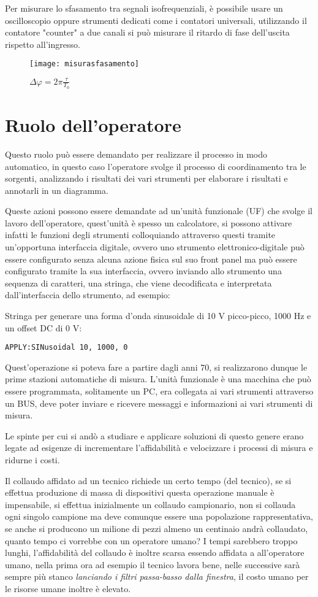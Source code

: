 Per misurare lo sfasamento tra segnali isofrequenziali, è possibile usare
un oscilloscopio
oppure strumenti dedicati come i contatori universali, utilizzando il contatore
"counter" a due
canali si può misurare il ritardo di fase dell'uscita rispetto all'ingresso.
\begin{figure}[h]
\centering\texttt{[image: misurasfasamento]}
\caption{$\Delta\varphi = 2\pi \frac{\tau}{T_0}$}
\end{figure}


\section{Ruolo dell'operatore}
Questo ruolo può essere demandato per realizzare il processo in modo automatico,
in questo caso l'operatore
svolge il processo di coordinamento tra le sorgenti, analizzando i risultati dei
vari strumenti per
elaborare i risultati e annotarli in un diagramma.

Queste azioni possono essere demandate ad un'unità funzionale (UF) che svolge il
lavoro
dell'operatore, quest'unità è spesso un calcolatore, si possono attivare infatti
le funzioni degli
strumenti colloquiando attraverso questi tramite un'opportuna interfaccia
digitale, ovvero uno
strumento elettronico-digitale può essere configurato senza alcuna azione fisica
sul suo front
panel ma può essere configurato tramite la sua interfaccia, ovvero inviando allo
strumento una
sequenza di caratteri, una stringa, che viene decodificata e interpretata
dall'interfaccia dello
strumento, ad esempio:

Stringa per generare una forma d'onda sinusoidale di 10 V picco-picco, 1000 Hz
e un offset DC di 0 V:

\noindent
\verb|APPLY:SINusoidal 10, 1000, 0|

Quest'operazione si poteva fare a partire dagli anni 70, si realizzarono dunque
le prime stazioni
automatiche di misura.
L'unità funzionale è una macchina che può essere programmata, solitamente un PC,
era collegata ai
vari strumenti attraverso un BUS, deve poter inviare e ricevere messaggi e
informazioni ai vari
strumenti di misura.

Le spinte per cui si andò a studiare e applicare soluzioni di questo genere
erano legate ad
esigenze di incrementare l'affidabilità e velocizzare i processi di misura e
ridurne i costi.

Il collaudo affidato ad un tecnico richiede un certo tempo (del tecnico), se si
effettua produzione
di massa di dispositivi questa operazione manuale è impensabile, si effettua
inizialmente un
collaudo campionario, non si collauda ogni singolo campione ma deve comunque
essere una popolazione
rappresentativa, se anche si producono un milione di pezzi almeno un centinaio
andrà
collaudato, quanto tempo ci vorrebbe con un operatore umano? I tempi sarebbero
troppo lunghi,
l'affidabilità del collaudo è inoltre scarsa essendo affidata a all'operatore
umano, nella prima
ora ad esempio il tecnico lavora bene, nelle successive sarà sempre più stanco
\textit{lanciando i filtri
passa-basso dalla finestra}, il costo umano per le risorse umane inoltre è
elevato.

